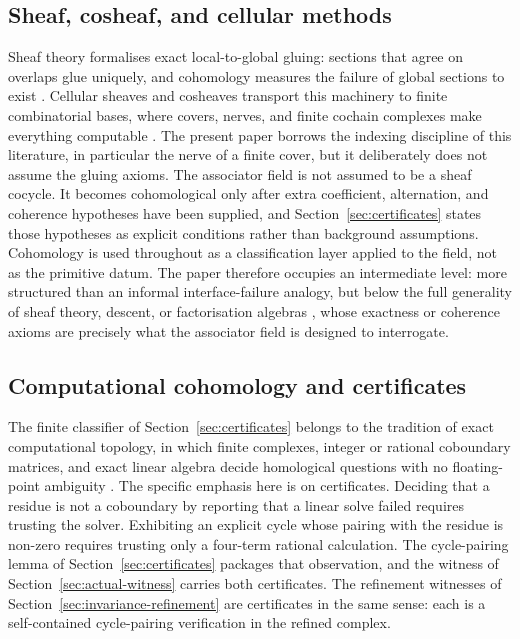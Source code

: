 \documentclass[11pt]{article}
\begin{document}
\subsection{Sheaf, cosheaf, and cellular methods}

Sheaf theory formalises exact local-to-global gluing: sections that agree on overlaps glue uniquely, and cohomology measures the failure of global sections to exist \cite{KashiwaraSchapira1990,BottTu1982}. Cellular sheaves and cosheaves transport this machinery to finite combinatorial bases, where covers, nerves, and finite cochain complexes make everything computable \cite{Curry2014,Ghrist2014,Robinson2014}. The present paper borrows the indexing discipline of this literature, in particular the nerve of a finite cover, but it deliberately does not assume the gluing axioms. The associator field is not assumed to be a sheaf cocycle. It becomes cohomological only after extra coefficient, alternation, and coherence hypotheses have been supplied, and Section~\ref{sec:certificates} states those hypotheses as explicit conditions rather than background assumptions. Cohomology is used throughout as a classification layer applied to the field, not as the primitive datum. The paper therefore occupies an intermediate level: more structured than an informal interface-failure analogy, but below the full generality of sheaf theory, descent, or factorisation algebras \cite{CostelloGwilliam2017}, whose exactness or coherence axioms are precisely what the associator field is designed to interrogate.

\subsection{Computational cohomology and certificates}

The finite classifier of Section~\ref{sec:certificates} belongs to the tradition of exact computational topology, in which finite complexes, integer or rational coboundary matrices, and exact linear algebra decide homological questions with no floating-point ambiguity \cite{EdelsbrunnerHarer2010,KaczynskiMischaikowMrozek2004,Zomorodian2005}. The specific emphasis here is on certificates. Deciding that a residue is not a coboundary by reporting that a linear solve failed requires trusting the solver. Exhibiting an explicit cycle whose pairing with the residue is non-zero requires trusting only a four-term rational calculation. The cycle-pairing lemma of Section~\ref{sec:certificates} packages that observation, and the witness of Section~\ref{sec:actual-witness} carries both certificates. The refinement witnesses of Section~\ref{sec:invariance-refinement} are certificates in the same sense: each is a self-contained cycle-pairing verification in the refined complex.
\end{document}
